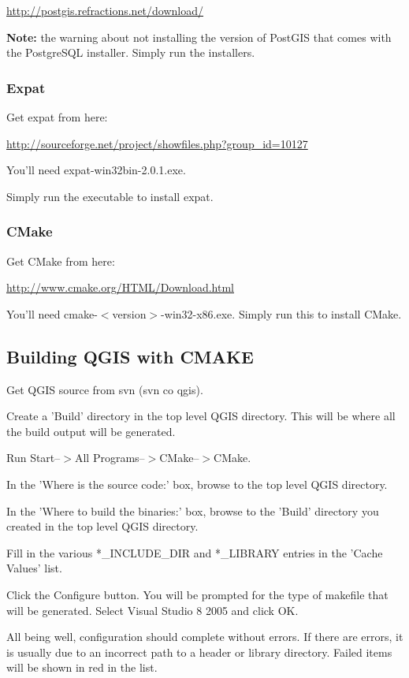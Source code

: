 \url{http://postgis.refractions.net/download/}

\textbf{Note:} the warning about not installing the version of PostGIS that comes with the PostgreSQL installer. Simply run the installers.

\subsubsection{Expat}
Get expat from here:

\url{http://sourceforge.net/project/showfiles.php?group\_id=10127}

You'll need expat-win32bin-2.0.1.exe.

Simply run the executable to install expat.

\subsubsection{CMake}
Get CMake from here:


\url{http://www.cmake.org/HTML/Download.html}

You'll need cmake-$<$version$>$-win32-x86.exe. Simply run this to install CMake.

\subsection{Building QGIS with CMAKE}
Get QGIS source from svn (svn co  qgis).

Create a 'Build' directory in the top level QGIS directory. This will be where all the build output will be generated.

Run Start--$>$All Programs--$>$CMake--$>$CMake. 

In the 'Where is the source code:' box, browse to the top level QGIS directory.

In the 'Where to build the binaries:' box, browse to the 'Build' directory you created in the top level QGIS directory.

Fill in the various *\_INCLUDE\_DIR and *\_LIBRARY entries in the 'Cache Values' list.

Click the Configure button. You will be prompted for the type of makefile that will be generated. Select Visual Studio 8 2005 and click OK.

All being well, configuration should complete without errors. If there are errors, it is usually due to an incorrect path to a header or library directory. Failed items will be shown in red in the list.


